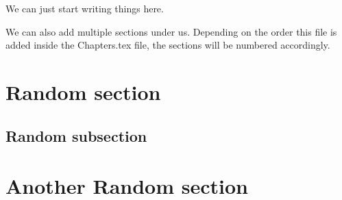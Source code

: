 We can just start writing things here.

We can also add multiple sections under us. Depending on the order this file is added inside the Chapters.tex file, the sections will be numbered accordingly.

\section{Random section}
\blindtext

\subsection{Random subsection}
\blindtext

\section{Another Random section}
\blindtext